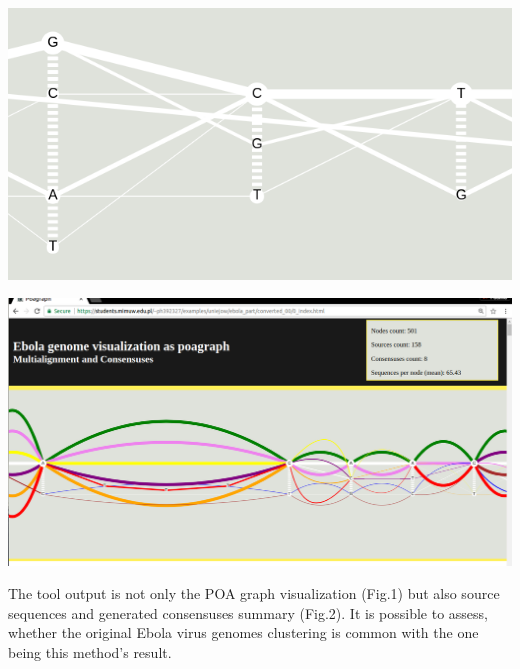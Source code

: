 \documentclass[a0paper,portrait]{baposter}
\begin{document}
\begin{poster}
{%

\begin{center}
\begin{minipage}{0.49\linewidth}
\includegraphics[width=1\linewidth]{ebola100_no_cons}
\end{minipage}
\begin{minipage}{0.49\linewidth}
\includegraphics[width=1\linewidth]{ebola_part}
\end{minipage}
\end{center}

The tool output is not only the POA graph visualization (Fig.1) but also source sequences and generated consensuses summary (Fig.2). It is possible to assess, whether the original Ebola virus genomes clustering is common with the one being this method's result. 
}





\end{poster}
\end{document}
